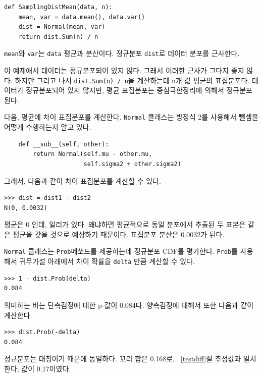 \begin{verbatim}
def SamplingDistMean(data, n):
    mean, var = data.mean(), data.var()
    dist = Normal(mean, var)
    return dist.Sum(n) / n
\end{verbatim}

{\tt mean}와 {\tt var}는 {\tt data} 평균과 분산이다.
정규분포 {\tt dist}로 데이터 분포를 근사한다.

이 예제애서 데이터는 정규분포되어 있지 않다. 그래서 이러한 근사가 그다지 좋지 않다. 하지만 그리고 나서 {\tt dist.Sum(n) / n}을 계산하는데 {\tt n}개 값 평균의 표집분포다. 데이터가 정규분포되어 있지 않지만, 평균 표집분포는 중심극한정리에 의해서 정규분포된다.

다음, 평균에 차이 표집분포를 계산한다.
{\tt Normal} 클래스는 방정식 2를 사용해서 뺄셈을 어떻게 수행하는지 알고 있다.

\begin{verbatim}
    def __sub__(self, other):
        return Normal(self.mu - other.mu,
                      self.sigma2 + other.sigma2)
\end{verbatim}

그래서, 다음과 같이 차이 표집분포를 계산할 수 있다.

\begin{verbatim}
>>> dist = dist1 - dist2
N(0, 0.0032)
\end{verbatim}

평균은 0 인데, 일리가 있다. 왜냐하면 평균적으로 동일 분포에서 추출된 두 표본은 같은 평균을 갖을 것으로 예상하기 때문이다. 표집분포 분산은 0.0032가 된다.

{\tt Normal} 클래스는 {\tt Prob}메쏘드를 제공하는데 정규분포 CDF를 평가한다. {\tt Prob}를 사용해서 귀무가설 아래에서 차이 확률을 {\tt delta} 만큼 계산할 수 있다.

\begin{verbatim}
>>> 1 - dist.Prob(delta)
0.084
\end{verbatim}

의미하는 바는 단측검정에 대한 p-값이 0.084다. 양측검정에 대해서 또한 다음과 같이 계산한다.

\begin{verbatim}
>>> dist.Prob(-delta)
0.084
\end{verbatim}

정규분포는 대칭이기 때문에 동일하다. 꼬리 합은 0.168로, ~\ref{testdiff}절 추정값과 일치한다; 값이 0.17이였다.



